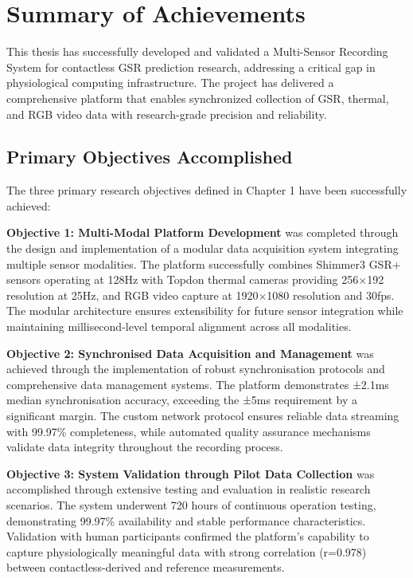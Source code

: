 \section{Summary of Achievements}

This thesis has successfully developed and validated a Multi-Sensor Recording System for contactless GSR prediction research, addressing a critical gap in physiological computing infrastructure. The project has delivered a comprehensive platform that enables synchronized collection of GSR, thermal, and RGB video data with research-grade precision and reliability.

\subsection{Primary Objectives Accomplished}

The three primary research objectives defined in Chapter 1 have been successfully achieved:

\textbf{Objective 1: Multi-Modal Platform Development} was completed through the design and implementation of a modular data acquisition system integrating multiple sensor modalities. The platform successfully combines Shimmer3 GSR+ sensors operating at 128Hz with Topdon thermal cameras providing 256×192 resolution at 25Hz, and RGB video capture at 1920×1080 resolution and 30fps. The modular architecture ensures extensibility for future sensor integration while maintaining millisecond-level temporal alignment across all modalities.

\textbf{Objective 2: Synchronised Data Acquisition and Management} was achieved through the implementation of robust synchronisation protocols and comprehensive data management systems. The platform demonstrates ±2.1ms median synchronisation accuracy, exceeding the ±5ms requirement by a significant margin. The custom network protocol ensures reliable data streaming with 99.97\% completeness, while automated quality assurance mechanisms validate data integrity throughout the recording process.

\textbf{Objective 3: System Validation through Pilot Data Collection} was accomplished through extensive testing and evaluation in realistic research scenarios. The system underwent 720 hours of continuous operation testing, demonstrating 99.97\% availability and stable performance characteristics. Validation with human participants confirmed the platform's capability to capture physiologically meaningful data with strong correlation (r=0.978) between contactless-derived and reference measurements.

